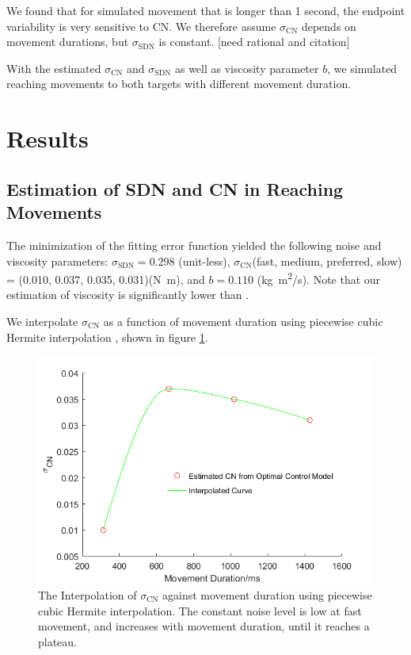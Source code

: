 We found that for simulated movement that is longer than 1 second, the endpoint variability is very sensitive to CN.
We therefore assume $\sigma_{\text{CN}}$ depends on movement durations, but $\sigma_{\text{SDN}}$ is constant. [need rational and citation] 

With the estimated  $\sigma_{\text{CN}}$ and $\sigma_{\text{SDN}}$ as well as viscosity parameter $ b $, we simulated reaching movements to both targets with different movement duration.

\section{Results}

\subsection{Estimation of SDN and CN in Reaching Movements}

The minimization of the fitting error function yielded the following noise and viscosity parameters: $\sigma_{\text{SDN}} = 0.298$ (unit-less), $\sigma_{\text{CN}}$(fast, medium, preferred, slow) = (0.010, 0.037, 0.035, 0.031)(\si{N.m}), and $b=0.110$ (\si{kg.m^2/s}). 
Note that our estimation of viscosity is significantly lower than \cite{VanBeers2004}. 

We interpolate $\sigma_{\text{CN}}$ as a function of movement duration using piecewise cubic Hermite interpolation \cite{Fritsch1980}, shown in figure \ref{fig:interpcn}.

\begin{figure}
	\centering
	\includegraphics[width=0.75\linewidth]{figures/interpCN}
	\caption[Interpolation of $\sigma_{\text{CN}}$]{The Interpolation of $\sigma_{\text{CN}}$ against movement duration using piecewise cubic Hermite interpolation. The constant noise level is low at fast movement, and increases with movement duration, until it reaches a plateau.}
	\label{fig:interpcn}
\end{figure}


